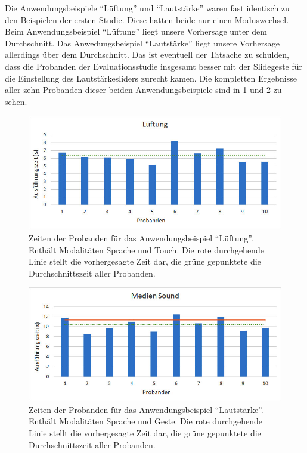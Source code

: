 Die Anwendungsbeispiele "`Lüftung"' und "`Lautstärke"' waren fast identisch zu den Beispielen der ersten Studie.
Diese hatten beide nur einen Moduswechsel.
Beim Anwendungsbeispiel "`Lüftung"' liegt unsere Vorhersage unter dem Durchschnitt.
Das Anwedungsbeispiel "`Lautstärke"' liegt unsere Vorhersage allerdings über dem Durchschnitt. 
Das ist eventuell der Tatsache zu schulden, dass die Probanden der Evaluationsstudie insgesamt besser mit der Slidegeste für die Einstellung des Lautstärkesliders zurecht kamen. 
Die kompletten Ergebnisse aller zehn Probanden dieser beiden Anwendungsbeispiele sind in \ref{fig:Luft_Times} und \ref{fig:MedienS_Times} zu sehen. 
\begin{figure}[ht]
			\centering
			\includegraphics[width=1\textwidth]{img/Luft_Times.jpg}
			\caption[Zeiten der Probanden für das Anwendungsbeispiel "`Lüftung"'.]{Zeiten der Probanden für das Anwendungsbeispiel "`Lüftung"'. Enthält Modalitäten Sprache und Touch. Die rote durchgehende Linie stellt die vorhergesagte Zeit dar, die grüne gepunktete die Durchschnittszeit aller Probanden.}
			\label{fig:Luft_Times}
\end{figure}
\begin{figure}[ht]
			\centering
			\includegraphics[width=1\textwidth]{img/Medien_S_Times.jpg}
			\caption[Zeiten der Probanden für das Anwendungsbeispiel "`Lautstärke"'.]{Zeiten der Probanden für das Anwendungsbeispiel "`Lautstärke"'. Enthält Modalitäten Sprache und Geste. Die rote durchgehende Linie stellt die vorhergesagte Zeit dar, die grüne gepunktete die Durchschnittszeit aller Probanden.}
			\label{fig:MedienS_Times}		
\end{figure}

